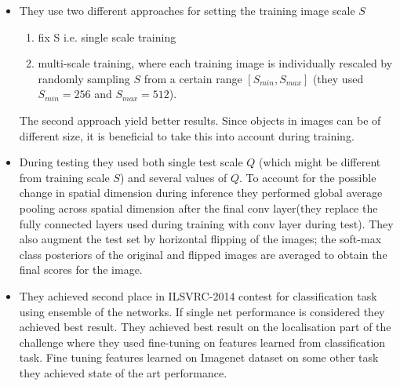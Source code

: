 \documentclass{article}
\begin{document}
\begin{itemize}
    \item They use two different approaches for setting the training image scale $S$
    \begin{enumerate}
        \item fix S i.e. single scale training
        \item multi-scale training, where each training image is individually rescaled by randomly sampling $S$ from a certain range $[S_{min}, S_{max}]$ (they used $S_{min}=256$ and $S_{max}=512$). 
    \end{enumerate}
     The second approach yield better results. Since objects in images can be of different size, it is beneficial to take this into account during training.
     \item During testing they used both single test scale $Q$ (which might be different from training scale $S$) and several values of $Q$. To account for the possible change in spatial dimension during inference they performed global average pooling across spatial dimension after the final conv layer(they replace the fully connected layers used during training with conv layer during test). They also augment the test set by horizontal flipping of the images; the soft-max class posteriors of the original and flipped images are averaged to obtain the final scores for the image.
     \item They achieved second place in ILSVRC-2014 contest for classification task using ensemble of the networks. If single net performance is considered they achieved best result. They achieved best result on the localisation part of the challenge where they used fine-tuning on features learned from classification task. Fine tuning features learned on Imagenet dataset on some other task they achieved state of the art performance.

\end{itemize}
\end{document}
